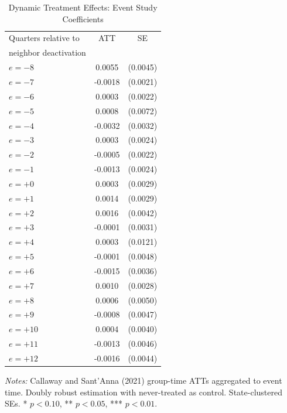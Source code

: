 \begin{table}[t]
\centering
\caption{Dynamic Treatment Effects: Event Study Coefficients}
\label{tab:event_study}
\begin{threeparttable}
\begin{tabular}{lcc}
\hline\hline
Quarters relative to & ATT & SE \\
neighbor deactivation & & \\
\hline
$e = -8$ & 0.0055 & (0.0045) \\
$e = -7$ & -0.0018 & (0.0021) \\
$e = -6$ & 0.0003 & (0.0022) \\
$e = -5$ & 0.0008 & (0.0072) \\
$e = -4$ & -0.0032 & (0.0032) \\
$e = -3$ & 0.0003 & (0.0024) \\
$e = -2$ & -0.0005 & (0.0022) \\
$e = -1$ & -0.0013 & (0.0024) \\
$e = +0$ & 0.0003 & (0.0029) \\
$e = +1$ & 0.0014 & (0.0029) \\
$e = +2$ & 0.0016 & (0.0042) \\
$e = +3$ & -0.0001 & (0.0031) \\
$e = +4$ & 0.0003 & (0.0121) \\
$e = +5$ & -0.0001 & (0.0048) \\
$e = +6$ & -0.0015 & (0.0036) \\
$e = +7$ & 0.0010 & (0.0028) \\
$e = +8$ & 0.0006 & (0.0050) \\
$e = +9$ & -0.0008 & (0.0047) \\
$e = +10$ & 0.0004 & (0.0040) \\
$e = +11$ & -0.0013 & (0.0046) \\
$e = +12$ & -0.0016 & (0.0044) \\
\hline\hline
\end{tabular}
\begin{tablenotes}[flushleft]\small
\item \textit{Notes:} Callaway and Sant'Anna (2021) group-time ATTs aggregated to event time. Doubly robust estimation with never-treated as control. State-clustered SEs. * $p<0.10$, ** $p<0.05$, *** $p<0.01$.
\end{tablenotes}
\end{threeparttable}
\end{table}

